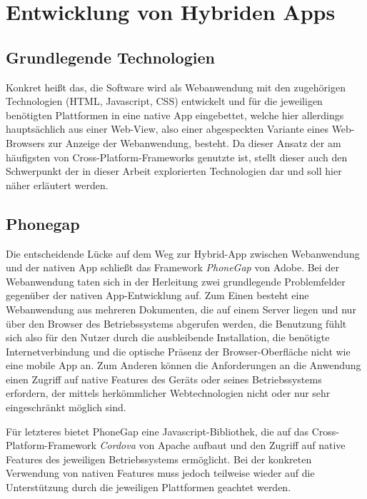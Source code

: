 \section{Entwicklung von Hybriden Apps}\label{hybrid}





\subsection{Grundlegende Technologien}
Konkret heißt das, die Software wird als Webanwendung mit den zugehörigen Technologien (HTML, Javascript, CSS) entwickelt und für die jeweiligen benötigten Plattformen in eine native App eingebettet, welche hier allerdings hauptsächlich aus einer Web-View, also einer abgespeckten Variante eines Web-Browsers zur Anzeige der Webanwendung, besteht. Da dieser Ansatz der am häufigsten von Cross-Platform-Frameworks genutzte ist,  stellt dieser auch den Schwerpunkt der in dieser Arbeit explorierten Technologien dar und soll hier näher erläutert werden. 

\subsection{Phonegap}
Die entscheidende Lücke auf dem Weg zur Hybrid-App zwischen Webanwendung und der nativen App schließt das Framework \emph{PhoneGap} von Adobe. 
Bei der Webanwendung taten sich in der Herleitung zwei grundlegende Problemfelder gegenüber der nativen App-Entwicklung auf. 
Zum Einen besteht eine Webanwendung aus mehreren Dokumenten, die auf einem Server liegen und nur über den Browser des Betriebssystems abgerufen werden, die Benutzung fühlt sich also für den Nutzer durch die ausbleibende Installation, die benötigte Internetverbindung und die optische Präsenz der Browser-Oberfläche nicht wie eine mobile App an. 
Zum Anderen können die Anforderungen an die Anwendung einen Zugriff auf native Features des Geräts oder seines Betriebssystems erfordern, der mittels herkömmlicher Webtechnologien nicht oder nur sehr eingeschränkt möglich sind. 

Für letzteres bietet PhoneGap eine Javascript-Bibliothek, die auf das Cross-Platform-Framework \emph{Cordova} von Apache aufbaut und den Zugriff auf native Features des jeweiligen Betriebssystems ermöglicht.
Bei der konkreten Verwendung von nativen Features muss jedoch teilweise wieder auf die Unterstützung durch die jeweiligen Plattformen geachtet werden.

